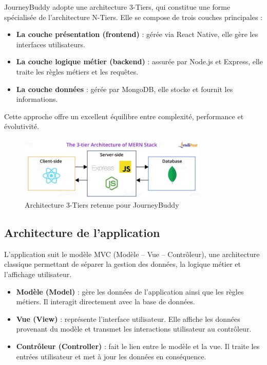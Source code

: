 JourneyBuddy adopte une architecture 3-Tiers, qui constitue une forme spécialisée de l’architecture N-Tiers. Elle se compose de trois couches principales :
\begin{itemize}
    \item \textbf{La couche présentation (frontend)} : gérée via React Native, elle gère les interfaces utilisateurs.
    \item \textbf{La couche logique métier (backend)} : assurée par Node.js et Express, elle traite les règles métiers et les requêtes.
    \item \textbf{La couche données} : gérée par MongoDB, elle stocke et fournit les informations.
\end{itemize}
Cette approche offre un excellent équilibre entre complexité, performance et évolutivité.

\newpage
\begin{figure}[H]
    \centering
    \includegraphics[width=0.8\textwidth]{figures/The-3-tier-Architecture-of-MERN-Stack.png}
    \caption{Architecture 3-Tiers retenue pour JourneyBuddy}
\end{figure}

\subsection{Architecture de l’application}

L'application suit le modèle MVC (Modèle – Vue – Contrôleur), une architecture classique permettant de séparer la gestion des données, la logique métier et l’affichage utilisateur.

\begin{itemize}
    \item \textbf{Modèle (Model)} : gère les données de l'application ainsi que les règles métiers. Il interagit directement avec la base de données.
    \item \textbf{Vue (View)} : représente l'interface utilisateur. Elle affiche les données provenant du modèle et transmet les interactions utilisateur au contrôleur.
    \item \textbf{Contrôleur (Controller)} : fait le lien entre le modèle et la vue. Il traite les entrées utilisateur et met à jour les données en conséquence.
\end{itemize}

